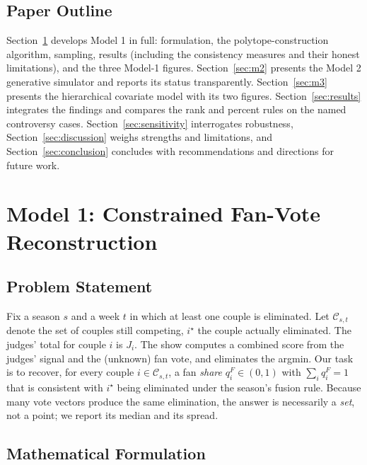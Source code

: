 \documentclass{article}
\begin{document}
\subsection{Paper Outline}

Section~\ref{sec:m1} develops Model 1 in full: formulation, the polytope-construction
algorithm, sampling, results (including the consistency measures and their honest
limitations), and the three Model-1 figures. Section~\ref{sec:m2} presents the Model 2
generative simulator and reports its status transparently. Section~\ref{sec:m3} presents
the hierarchical covariate model with its two figures. Section~\ref{sec:results} integrates
the findings and compares the rank and percent rules on the named controversy cases.
Section~\ref{sec:sensitivity} interrogates robustness, Section~\ref{sec:discussion} weighs
strengths and limitations, and Section~\ref{sec:conclusion} concludes with recommendations
and directions for future work.

\section{Model 1: Constrained Fan-Vote Reconstruction}\label{sec:m1}

\subsection{Problem Statement}

Fix a season $s$ and a week $t$ in which at least one couple is eliminated. Let
$\mathcal{C}_{s,t}$ denote the set of couples still competing, $i^{\star}$ the couple
actually eliminated. The judges' total for couple $i$ is $J_{i}$. The show computes a
combined score from the judges' signal and the (unknown) fan vote, and eliminates the
argmin. Our task is to recover, for every couple $i\in\mathcal{C}_{s,t}$, a fan
\emph{share} $q^{F}_{i}\in(0,1)$ with $\sum_{i}q^{F}_{i}=1$ that is consistent with
$i^{\star}$ being eliminated under the season's fusion rule. Because many vote vectors
produce the same elimination, the answer is necessarily a \emph{set}, not a point; we
report its median and its spread.

\subsection{Mathematical Formulation}
\end{document}
